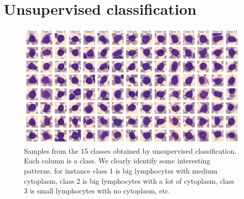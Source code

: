 \documentclass{midl}
\begin{document}
\section{Unsupervised classification}

\begin{figure}[H]
    \centering
    \includegraphics[width=\textwidth]{figures/unsupervised_classification.png}
    \caption{Samples from the 15 classes obtained by unsupervised classification. Each column is a class. We clearly identify some interesting patterns, for instance class 1 is big lymphocytes with medium cytoplasm, class 2 is big lymphocytes with a lot of cytoplasm, class 3 is small lymphocytes with no cytoplasm, etc.}
    \label{fig:unsupervised_classification}
\end{figure}
\end{document}
